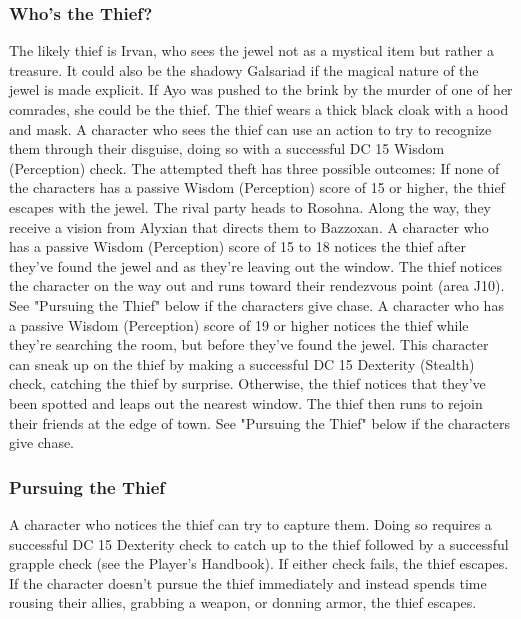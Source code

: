 \documentclass[10pt,a4,twoside,twocolumn,openany,nodeprecatedcode]{dndbook}
\begin{document}
\subsubsection{Who's the Thief?}
The likely thief is Irvan, who sees the jewel not as a mystical item but rather a treasure. It could also be the shadowy Galsariad if the magical nature of the jewel is made explicit. If Ayo was pushed to the brink by the murder of one of her comrades, she could be the thief.
The thief wears a thick black cloak with a hood and mask. A character who sees the thief can use an action to try to recognize them through their disguise, doing so with a successful DC 15 Wisdom (Perception) check.
The attempted theft has three possible outcomes:
{{If none of the characters has a passive Wisdom (Perception) score of 15 or higher, the thief escapes with the jewel. The rival party heads to Rosohna. Along the way, they receive a vision from Alyxian that directs them to Bazzoxan.}}
{{A character who has a passive Wisdom (Perception) score of 15 to 18 notices the thief after they've found the jewel and as they're leaving out the window. The thief notices the character on the way out and runs toward their rendezvous point (area J10). See "Pursuing the Thief" below if the characters give chase.}}
{{A character who has a passive Wisdom (Perception) score of 19 or higher notices the thief while they're searching the room, but before they've found the jewel. This character can sneak up on the thief by making a successful DC 15 Dexterity (Stealth) check, catching the thief by surprise. Otherwise, the thief notices that they've been spotted and leaps out the nearest window. The thief then runs to rejoin their friends at the edge of town. See "Pursuing the Thief" below if the characters give chase.}}
\subsubsection{Pursuing the Thief}
A character who notices the thief can try to capture them. Doing so requires a successful DC 15 Dexterity check to catch up to the thief followed by a successful grapple check (see the Player's Handbook). If either check fails, the thief escapes.
If the character doesn't pursue the thief immediately and instead spends time rousing their allies, grabbing a weapon, or donning armor, the thief escapes.
\end{document}
